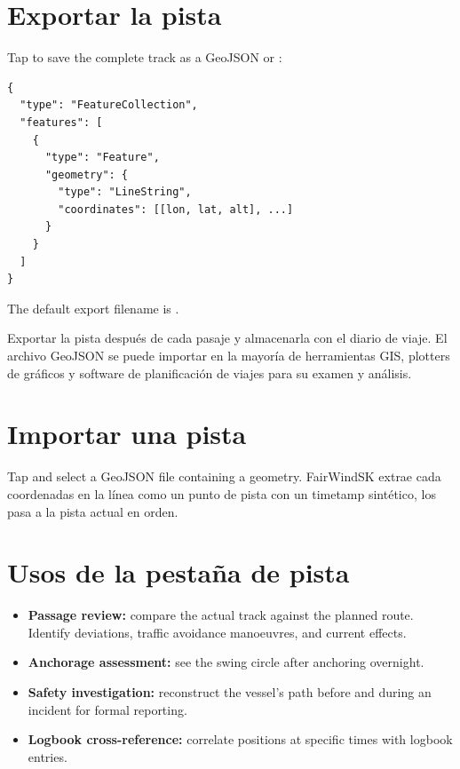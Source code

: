 \section{Exportar la pista}

Tap  to save the complete track as a GeoJSON  or
:

\begin{lstlisting}
{
  "type": "FeatureCollection",
  "features": [
    {
      "type": "Feature",
      "geometry": {
        "type": "LineString",
        "coordinates": [[lon, lat, alt], ...]
      }
    }
  ]
}
\end{lstlisting}

The default export filename is .

\begin{tipbox}
Exportar la pista después de cada pasaje y almacenarla con el diario de viaje.
El archivo GeoJSON se puede importar en la mayoría de herramientas GIS, plotters de gráficos y software de planificación de viajes
para su examen y análisis.
\end{tipbox}

\section{Importar una pista}

Tap  and select a GeoJSON file containing a  geometry.
FairWindSK extrae cada coordenadas en la línea como un punto de pista con un timetamp sintético,
los pasa a la pista actual en orden.

\section{Usos de la pestaña de pista}

\begin{itemize}
  \item \textbf{Passage review:} compare the actual track against the planned route. Identify deviations, traffic avoidance manoeuvres, and current effects.
  \item \textbf{Anchorage assessment:} see the swing circle after anchoring overnight.
  \item \textbf{Safety investigation:} reconstruct the vessel's path before and during an incident for formal reporting.
  \item \textbf{Logbook cross-reference:} correlate positions at specific times with logbook entries.
\end{itemize}


